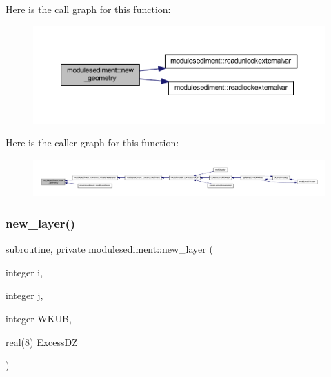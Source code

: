 Here is the call graph for this function\+:\nopagebreak
\begin{figure}[H]
\begin{center}
\leavevmode
\includegraphics[width=350pt]{namespacemodulesediment_aa3fda34444f716aac00714d297af27d3_cgraph}
\end{center}
\end{figure}
Here is the caller graph for this function\+:\nopagebreak
\begin{figure}[H]
\begin{center}
\leavevmode
\includegraphics[width=350pt]{namespacemodulesediment_aa3fda34444f716aac00714d297af27d3_icgraph}
\end{center}
\end{figure}
\mbox{\label{namespacemodulesediment_acfebb5e32f4481cbb0199b98dc4ff545}} 
\subsubsection{\texorpdfstring{new\+\_\+layer()}{new\_layer()}}
{\footnotesize\ttfamily subroutine, private modulesediment\+::new\+\_\+layer (\begin{DoxyParamCaption}\item[{integer}]{i,  }\item[{integer}]{j,  }\item[{integer}]{W\+K\+UB,  }\item[{real(8)}]{Excess\+DZ }\end{DoxyParamCaption})\hspace{0.3cm}{\ttfamily [private]}}

